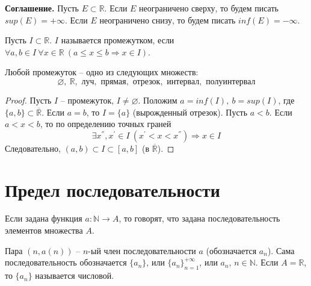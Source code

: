     \textbf{Соглашение.} Пусть $E \subset \mathds{R}$. Если $E$ неограничено сверху, то будем писать $sup(E) = + \infty$. Если $E$ неограничено снизу, то будем писать $inf(E) = - \infty$.
    
    \begin{definition}
        Пусть $I \subset \mathds{R}$. $I$ называется промежутком, если $\forall a,b \in I \  \forall x \in \mathds{R} \  (a \leq x \leq b \Rightarrow x \in I)$.
    \end{definition}
    
    \begin{lemma}
        Любой промежуток -- одно из следующих множеств:
        \[\varnothing, \ \mathds{R}, \text{ луч}, \text{ прямая}, \text{ отрезок}, \text{ интервал}, \text{ полуинтервал}\]
    \end{lemma}
    
    \begin{proof}
        Пусть $I$ -- промежуток, $I \neq \varnothing$. Положим $a = inf(I), \ b = sup(I)$, где $\{a,b\} \subset \overline{\mathds{R}}$. Если $a = b$, то $I = \{a\}$ (вырожденный отрезок). Пусть $a < b$. Если $a < x < b$, то по определению точных граней
        \[\exists x^{''}, x^{'} \in I \  (x ^{'} < x < x^{''}) \Rightarrow x \in I\]
        Следовательно, $(a,b) \subset I \subset [a, b]$ (в $\overline{\mathds{R}}$).
    \end{proof}

\section{Предел последовательности}

    Если задана функция $a: \mathds{N} \longrightarrow A$, то говорят, что задана последовательность элементов множества $A$.
    
    \begin{definition}
        Пара $(n, a(n))$ -- $n$-ый член последовательности $a$ (обозначается $a_{n}$). Сама последовательность обозначается $\{a_{n}\}$, или $\{a_{n}\}^{+ \infty}_{n = 1}$, или $a_{n}$, $n \in \mathds{N}$. Если $A = \mathds{R}$, то $\{a_{n}\}$ называется числовой.
    \end{definition}
